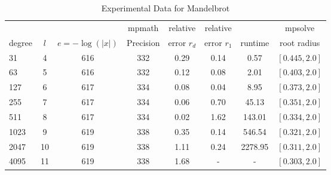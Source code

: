 \documentclass[sigconf]{acmart}
\begin{document}
\begin{table}[t]
\caption{Experimental Data for Mandelbrot}
\label{tab:mand}
\vskip 0.15in
\begin{center}
\begin{small}
\begin{sc}
\begin{tabular}{lccccccc}
\toprule
&  &  & mpmath & relative  & relative &  & mpsolve \\
degree  & $l$& $e=-\log(|x|)$& Precision &error $r_d$       & error $r_1$ &runtime& root radius\\
\midrule
     31 & 4 & 616 & 332 & 0.29 & 0.14 & 0.57 & $[0.445, 2.0]$\\
     63 & 5 & 616 & 332 & 0.12 & 0.08 & 2.01 & $[0.403, 2.0]$\\
   127 & 6 & 617 & 334 & 0.08 & 0.04 & 8.95 & $[0.373,2.0]$ \\
   255 & 7 & 617 & 334 & 0.06 & 0.70 & 45.13 & $[0.351, 2.0]$\\
   511 & 8 & 617 & 334 & 0.02 & 1.62 & 143.01 & $[0.334, 2.0]$\\
 1023 & 9 & 619 & 338 & 0.35 & 0.14 & 546.54 & $[0.321,2.0]$\\
 2047 &10& 619 & 338 & 1.11 & 0.24 & 2278.95 & $[0.311,2.0]$\\
 4095 & 11 & 619 & 338 & 1.68 & - & - & $[0.303,2.0]$\\

\bottomrule
\end{tabular}
\end{sc}
\end{small}
\end{center}
\vskip -0.1in
\end{table}
\end{document}
